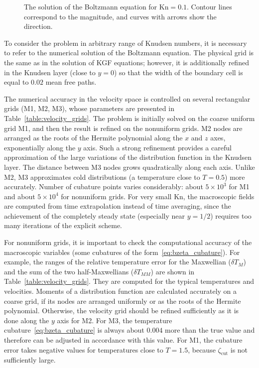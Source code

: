 \documentclass[10pt]{article}
\newcommand{\Kn}{\mathrm{Kn}}
\begin{document}
\begin{figure}
    \centering
    \caption{The solution of the Boltzmann equation for \(\Kn=0.1\).
        Contour lines correspond to the magnitude, and curves with arrows show the direction.}
    \label{fig:kn0.1}
\end{figure}

To consider the problem in arbitrary range of Knudsen numbers,
it is necessary to refer to the numerical solution of the Boltzmann equation.
The physical grid is the same as in the solution of KGF equations;
however, it is additionally refined in the Knudsen layer (close to \(y=0\))
so that the width of the boundary cell is equal to \(0.02\) mean free paths.

The numerical accuracy in the velocity space is controlled on several rectangular grids (M1, M2, M3),
whose parameters are presented in Table~\ref{table:velocity_grids}.
The problem is initially solved on the coarse uniform grid M1,
and then the result is refined on the nonuniform grids.
M2 nodes are arranged as the roots of the Hermite polynomial along the \(x\) and \(z\) axes,
exponentially along the \(y\) axis. Such a strong refinement provides a careful approximation
of the large variations of the distribution function in the Knudsen layer.
The distance between M3 nodes grows quadratically along each axis.
Unlike M2, M3 approximates cold distributions (a temperature close to \(T=0.5\)) more accurately.
Number of cubature points varies considerably:
about \(5\times 10^3\) for M1 and about \(5\times 10^4\) for nonuniform grids.
For very small \(\Kn\), the macroscopic fields are computed from time extrapolation instead of time averaging,
since the achievement of the completely steady state (especially near \(y=1/2\))
requires too many iterations of the explicit scheme.

For nonuniform grids, it is important to check the computational accuracy of the macroscopic variables
(some cubatures of the form~\eqref{eq:bzeta_cubature}).
For example, the ranges of the relative temperature error for the Maxwellian (\(\delta T_M\))
and the sum of the two half-Maxwellians (\(\delta T_{MM}\)) are shown in Table~\ref{table:velocity_grids}.
They are computed for the typical temperatures and velocities.
Moments of a distribution function are calculated accurately on a coarse grid,
if its nodes are arranged uniformly or as the roots of the Hermite polynomial.
Otherwise, the velocity grid should be refined sufficiently as it is done along the \(y\) axis for M2.
For M3, the temperature cubature~\eqref{eq:bzeta_cubature} is always about \(0.004\) more than the true value
and therefore can be adjusted in accordance with this value.
For M1, the cubature error takes negative values for temperatures close to \(T=1.5\),
because \(\zeta_{\mathrm{cut}}\) is not sufficiently large.
\end{document}
